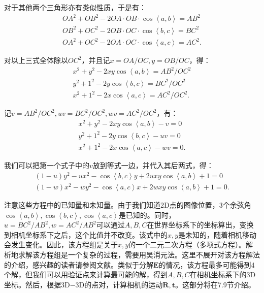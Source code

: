 对于其他两个三角形亦有类似性质，于是有：
\begin{equation}
\begin{array}{l}
O{A^2} + O{B^2} - 2OA \cdot OB \cdot \cos \left\langle a,b \right \rangle  = A{B^2}\\
O{B^2} + O{C^2} - 2OB \cdot OC \cdot \cos \left\langle b,c \right \rangle  = B{C^2}\\
O{A^2} + O{C^2} - 2OA \cdot OC \cdot \cos \left\langle a,c \right \rangle  = A{C^2}.
\end{array}
\end{equation}

对以上三式全体除以$OC^2$，并且记$x=OA/OC, y=OB/OC$，得：
\begin{equation}
\begin{array}{l}
{x^2} + {y^2} - 2xy\cos \left\langle a,b \right \rangle  = A{B^2}/O{C^2}\\
{y^2} + {1^2} - 2y\cos \left\langle b,c \right \rangle  = B{C^2}/O{C^2}\\
{x^2} + {1^2} - 2x\cos \left\langle a,c \right \rangle  = A{C^2}/O{C^2}.
\end{array}
\end{equation}

记$v = AB^2/OC^2, uv = BC^2/OC^2, wv = AC^2/OC^2$，有：
\begin{equation}
\begin{array}{l}
{x^2} + {y^2} - 2xy\cos \left\langle a,b \right \rangle  - v = 0\\
{y^2} + {1^2} - 2y\cos \left\langle b,c \right \rangle  - uv = 0\\
{x^2} + {1^2} - 2x\cos \left\langle a,c \right \rangle  - wv = 0.
\end{array}
\end{equation}

我们可以把第一个式子中的$v$放到等式一边，并代入其后两式，得：
\begin{equation}
\begin{array}{l}
\left( {1 - u} \right){y^2} - u{x^2} - \cos \left\langle b,c \right \rangle y + 2uxy\cos \left\langle a,b \right \rangle  + 1 = 0 \\
\left( {1 - w} \right){x^2} - w{y^2} - \cos \left\langle a,c \right \rangle x + 2wxy\cos \left\langle a,b \right \rangle  + 1 = 0.
\end{array}
\end{equation}

注意这些方程中的已知量和未知量。由于我们知道2D点的图像位置，3个余弦角$\cos \left \langle a,b \right \rangle, \cos \left\langle b,c \right \rangle, \cos \left\langle a,c \right \rangle$是已知的。同时，$u=BC^2/AB^2, w=AC^2/AB^2$可以通过$A,B,C$在世界坐标系下的坐标算出，变换到相机坐标系下之后，这个比值并不改变。该式中的$x,y$是未知的，随着相机移动会发生变化。因此，该方程组是关于$x,y$的一个二元二次方程（多项式方程）。解析地求解该方程组是一个复杂的过程，需要用吴消元法。这里不展开对该方程解法的介绍，感兴趣的读者请参阅文献\cite{GaoHouTangEtAl2003}。类似于分解$\bm{E}$的情况，该方程最多可能得到4个解，但我们可以用验证点来计算最可能的解，得到$A,B,C$在相机坐标系下的3D坐标。然后，根据3D−3D的点对，计算相机的运动$\bm{R}, \bm{t}$。这部分将在7.9节介绍。

